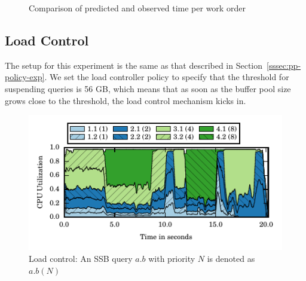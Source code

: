 \begin{figure}[]
	\centering
	\caption{Comparison of predicted and observed time per work order}
	\label{fig:pred-vs-observed-time-per-wo}
	\vspace{-1em}
\end{figure}

\subsection{Load Control}
The setup for this experiment is the same as that described in Section~\ref{sssec:pp-policy-exp}.
We set the load controller policy to specify that the threshold for suspending queries is 56 GB, which means that as soon as the buffer pool size grows close to the threshold, the load control mechanism kicks in.

\begin{figure}[t]
	\centering
	\includegraphics[width=\columnwidth]{figures/load-control-cpu-util.pdf}
	\caption{Load control: An SSB query $a.b$ with priority $N$ is denoted as $a.b (N)$}
	\label{fig:load-control-cpu-util}
\end{figure}

